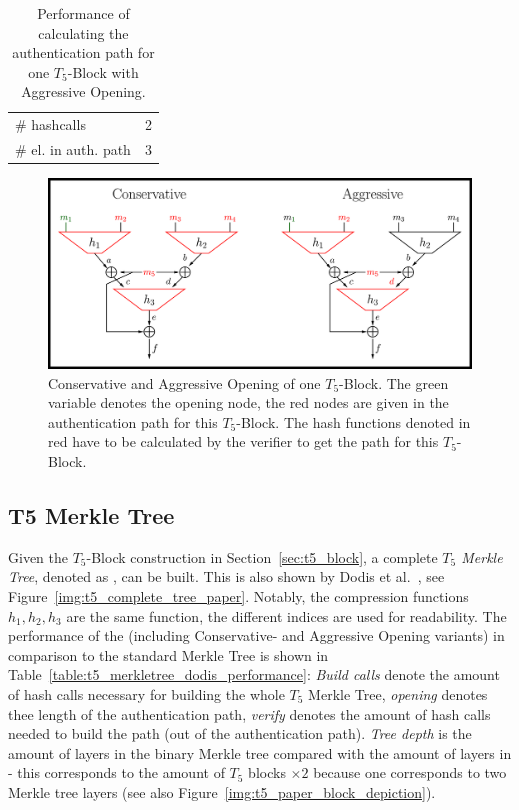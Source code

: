 \begin{table}
\centering
\begin{tabular}{l c} 
 \hline\noalign{\smallskip}
 \multicolumn{2}{c}{\textbf{Aggressive Opening}} \\
 \hline\noalign{\smallskip}
 \# hashcalls & 2 \\
 \# el. in auth. path & 3 \\
 \hline
\end{tabular}
\caption{Performance of calculating the authentication path for one $T_5$-Block with Aggressive Opening.}
\label{table:aggr_opening}
\end{table}

\begin{figure}
\centering
\includegraphics[]{images/Methods/aggr_conserv_opening_T5.png}
\caption{Conservative and Aggressive Opening of one $T_5$-Block. The green variable denotes the opening node, the red nodes are given in the authentication path for this $T_5$-Block. The hash functions denoted in red have to be calculated by the verifier to get the path for this $T_5$-Block.~\cite{T5_paper}}
\label{img:t5_conserv_aggr_opening}
\end{figure}

\subsection{T5 Merkle Tree}
\label{sec:dodis_t5_merkle_tree}
Given the $T_5$-Block construction in Section~\ref{sec:t5_block}, a complete \textit{$T_5$ Merkle Tree}, denoted as \textit{\tftree}, can be built. This is also shown by Dodis et al.~\cite{T5_paper}, see Figure~\ref{img:t5_complete_tree_paper}. Notably, the compression functions $h_1, h_2, h_3$ are the same function, the different indices are used for readability. The performance of the \tftree (including Conservative- and Aggressive Opening variants) in comparison to the standard Merkle Tree is shown in Table~\ref{table:t5_merkletree_dodis_performance}: \textit{Build calls} denote the amount of hash calls necessary for building the whole $T_5$ Merkle Tree, \textit{opening} denotes thee length of the authentication path, \textit{verify} denotes the amount of hash calls needed to build the path (out of the authentication path). \textit{Tree depth} is the amount of layers in the binary Merkle tree compared with the amount of layers in \tftree - this corresponds to the amount of $T_5$ blocks $\times 2$ because one \tfblock corresponds to two Merkle tree layers (see also Figure~\ref{img:t5_paper_block_depiction}).

